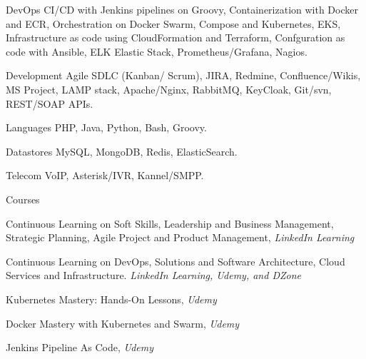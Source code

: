 
\begin{cvdesc}

  \cvdesch
    {DevOps} %
    {CI/CD with Jenkins pipelines on Groovy, Containerization with Docker and ECR, Orchestration on Docker Swarm, Compose and Kubernetes, EKS, Infrastructure as code using CloudFormation and Terraform, Confguration as code with Ansible, ELK Elastic Stack, Prometheus/Grafana, Nagios.} %

  \cvdesch
    {Development} %
    {Agile SDLC (Kanban/ Scrum), JIRA, Redmine, Confluence/Wikis, MS Project, LAMP stack, Apache/Nginx, RabbitMQ, KeyCloak, Git/svn, REST/SOAP APIs.} %

  \cvdesch
    {Languages} %
    {PHP, Java, Python, Bash, Groovy.} %

  \cvdesch
    {Datastores} %
    {MySQL, MongoDB, Redis, ElasticSearch.} %

  \cvdesch
    {Telecom} %
    {VoIP, Asterisk/IVR, Kannel/SMPP.} %

\end{cvdesc}

\begin{cvdesc}
  \cvdescv
    {Courses}
    {
      \begin{cvitems}
      \item {Continuous Learning on Soft Skills, Leadership and Business Management, Strategic Planning, Agile Project and Product Management, \textit{LinkedIn Learning}}
      \item {Continuous Learning on DevOps, Solutions and Software Architecture, Cloud Services and Infrastructure. \textit{LinkedIn Learning, Udemy, and DZone}}
      \item {Kubernetes Mastery: Hands-On Lessons, \textit{Udemy}}
      \item {Docker Mastery with Kubernetes and Swarm, \textit{Udemy}}
      \item {Jenkins Pipeline As Code, \textit{Udemy}}
      \end{cvitems}
    }

\end{cvdesc}
